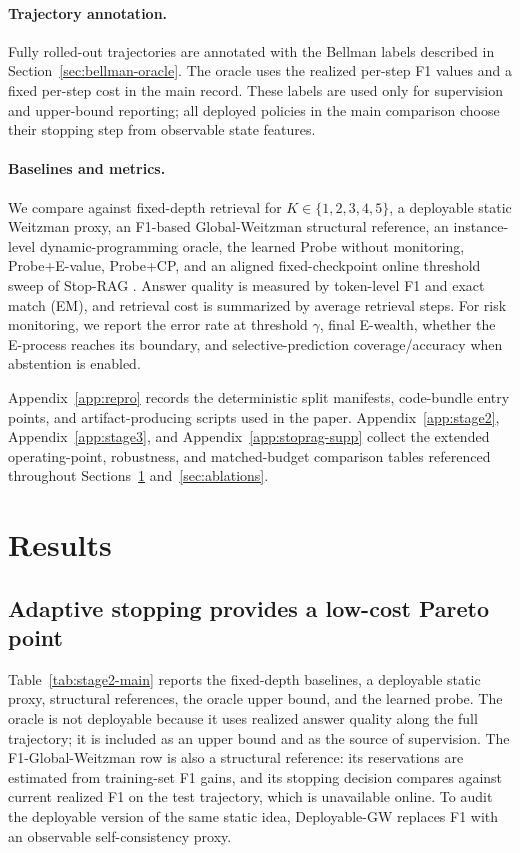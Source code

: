 \documentclass{article}
\begin{document}
\paragraph{Trajectory annotation.}
Fully rolled-out trajectories are annotated with the Bellman labels described in Section~\ref{sec:bellman-oracle}. The oracle uses the realized per-step F1 values and a fixed per-step cost in the main record. These labels are used only for supervision and upper-bound reporting; all deployed policies in the main comparison choose their stopping step from observable state features.

\paragraph{Baselines and metrics.}
We compare against fixed-depth retrieval for $K\in\{1,2,3,4,5\}$, a deployable static Weitzman proxy, an F1-based Global-Weitzman structural reference, an instance-level dynamic-programming oracle, the learned Probe without monitoring, Probe+E-value, Probe+CP, and an aligned fixed-checkpoint online threshold sweep of Stop-RAG \citep{parkStopRAGValueBasedRetrieval2025}. Answer quality is measured by token-level F1 and exact match (EM), and retrieval cost is summarized by average retrieval steps. For risk monitoring, we report the error rate at threshold $\gamma$, final E-wealth, whether the E-process reaches its boundary, and selective-prediction coverage/accuracy when abstention is enabled.

Appendix~\ref{app:repro} records the deterministic split manifests, code-bundle entry points, and artifact-producing scripts used in the paper. Appendix~\ref{app:stage2}, Appendix~\ref{app:stage3}, and Appendix~\ref{app:stoprag-supp} collect the extended operating-point, robustness, and matched-budget comparison tables referenced throughout Sections~\ref{sec:results} and~\ref{sec:ablations}.

\section{Results}
\label{sec:results}

\subsection{Adaptive stopping provides a low-cost Pareto point}
\label{sec:adaptive-results}

Table~\ref{tab:stage2-main} reports the fixed-depth baselines, a deployable static proxy, structural references, the oracle upper bound, and the learned probe. The oracle is not deployable because it uses realized answer quality along the full trajectory; it is included as an upper bound and as the source of supervision. The F1-Global-Weitzman row is also a structural reference: its reservations are estimated from training-set F1 gains, and its stopping decision compares against current realized F1 on the test trajectory, which is unavailable online. To audit the deployable version of the same static idea, Deployable-GW replaces F1 with an observable self-consistency proxy.
\end{document}
